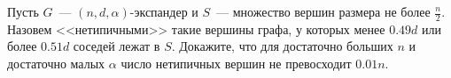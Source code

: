 Пусть $G$~--- $(n, d, \alpha)$-экспандер и $S$~--- множество вершин размера не более $\frac{n}{2}$. Назовем <<нетипичными>>
такие вершины графа, у которых менее $0.49 d$ или более $0.51 d$ соседей лежат в $S$. Докажите, что для достаточно больших
$n$ и достаточно малых $\alpha$ число нетипичных вершин не превосходит $0.01 n$.